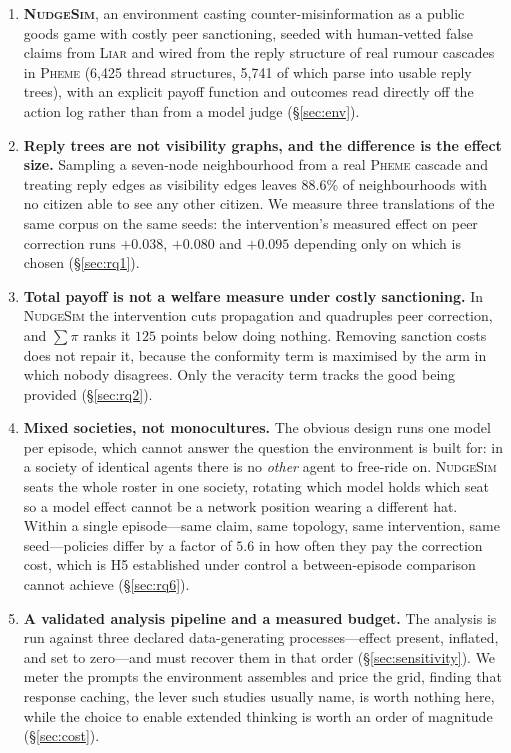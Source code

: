 \documentclass{article}
\begin{document}
\begin{enumerate}
\item \textbf{\textsc{NudgeSim}}, an environment casting counter-misinformation
  as a public goods game with costly peer sanctioning, seeded with human-vetted
  false claims from \textsc{Liar} \citep{wang2017liar} and wired from the reply
  structure of real rumour cascades in \textsc{Pheme} \citep{kochkina2018pheme}
  (6{,}425 thread structures, 5{,}741 of which parse into usable reply trees), with an explicit payoff function and outcomes read
  directly off the action log rather than from a model judge
  (\S\ref{sec:env}).

\item \textbf{Reply trees are not visibility graphs, and the difference is the
  effect size.} Sampling a seven-node neighbourhood from a real \textsc{Pheme}
  cascade and treating reply edges as visibility edges leaves 88.6\% of
  neighbourhoods with no citizen able to see any other citizen. We measure three
  translations of the same corpus on the same seeds: the intervention's measured
  effect on peer correction runs $+0.038$, $+0.080$ and $+0.095$ depending only
  on which is chosen (\S\ref{sec:rq1}).

\item \textbf{Total payoff is not a welfare measure under costly sanctioning.}
  In \textsc{NudgeSim} the intervention cuts propagation and quadruples peer
  correction, and $\sum\pi$ ranks it $125$ points below doing nothing.
  Removing sanction costs does not repair it, because the conformity term is
  maximised by the arm in which nobody disagrees. Only the veracity term tracks
  the good being provided (\S\ref{sec:rq2}).

\item \textbf{Mixed societies, not monocultures.} The obvious design runs one
  model per episode, which cannot answer the question the environment is built
  for: in a society of identical agents there is no \emph{other} agent to
  free-ride on. \textsc{NudgeSim} seats the whole roster in one society,
  rotating which model holds which seat so a model effect cannot be a network
  position wearing a different hat. Within a single episode---same claim, same
  topology, same intervention, same seed---policies differ by a factor of $5.6$
  in how often they pay the correction cost, which is H5 established under
  control a between-episode comparison cannot achieve (\S\ref{sec:rq6}).

\item \textbf{A validated analysis pipeline and a measured budget.} The analysis
  is run against three declared data-generating processes---effect present,
  inflated, and set to zero---and must recover them in that order
  (\S\ref{sec:sensitivity}). We meter the prompts the environment assembles and
  price the grid, finding that response caching, the lever such studies usually
  name, is worth nothing here, while the choice to enable extended thinking is
  worth an order of magnitude (\S\ref{sec:cost}).
\end{enumerate}
\end{document}
